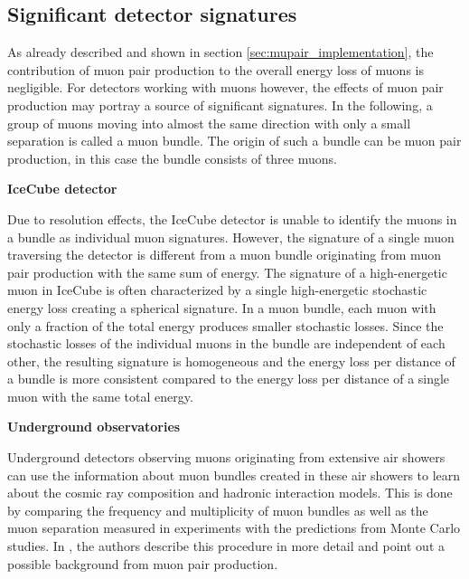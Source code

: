 \subsection{Significant detector signatures}
\label{sec:signatures}

As already described and shown in section \ref{sec:mupair_implementation}, the contribution of muon pair production to the overall energy loss of muons is negligible.
For detectors working with muons however, the effects of muon pair production may portray a source of significant signatures.
In the following, a group of muons moving into almost the same direction with only a small separation is called a muon bundle.
The origin of such a bundle can be muon pair production, in this case the bundle consists of three muons.

\textbf{IceCube detector}

Due to resolution effects, the IceCube detector is unable to identify the muons in a bundle as individual muon signatures.
However, the signature of a single muon traversing the detector is different from a muon bundle originating from muon pair production with the same sum of energy.
The signature of a high-energetic muon in IceCube is often characterized by a single high-energetic stochastic energy loss creating a spherical signature.
In a muon bundle, each muon with only a fraction of the total energy produces smaller stochastic losses.
Since the stochastic losses of the individual muons in the bundle are independent of each other, the resulting signature is homogeneous and the energy loss per distance of a bundle is more consistent compared to the energy loss per distance of a single muon with the same total energy. 

\textbf{Underground observatories}

Underground detectors observing muons originating from extensive air showers can use the information about muon bundles created in these air showers to learn about the cosmic ray composition and hadronic interaction models.
This is done by comparing the frequency and multiplicity of muon bundles as well as the muon separation measured in experiments with the predictions from Monte Carlo studies.
In \cite{MupairInRock}, the authors describe this procedure in more detail and point out a possible background from muon pair production.

